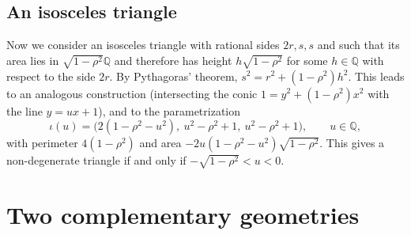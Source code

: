 \documentclass[11pt]{amsart}
\theoremstyle{plain}
\theoremstyle{remark}
\theoremstyle{plain}
\newcommand{\Q}{\mathbb{Q}}
\begin{document}
\subsection{An isosceles triangle}
Now we consider an isosceles triangle with rational sides $2r,s,s$ and such that its area lies in $\sqrt{1-\rho^{2}}\Q$ and therefore has height $h\sqrt{1-\rho^2}$ for some $h\in\Q$ with respect to the side $2r$. By Pythagoras' theorem, $s^2=r^2+(1-\rho^2)h^2$. This leads to an
 analogous construction (intersecting the conic
$1=y^{2}+(1-\rho^{2})x^{2}$ with the line $y=ux+1$), and to the parametrization
\[
  \iota(u)=\bigl(2(1-\rho^{2}-u^{2}),\ u^{2}-\rho^{2}+1,\ u^{2}-\rho^{2}+1\bigr),
  \qquad u\in\Q,
\]
with perimeter $4(1-\rho^{2})$ and area $-2u(1-\rho^{2}-u^{2})\sqrt{1-\rho^{2}}$.
This gives a non-degenerate triangle if and only if $-\sqrt{1-\rho^2}<u<0$.

\section{Two complementary geometries}\label{sec:two-geometries}
\end{document}
